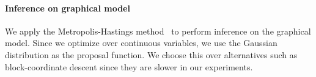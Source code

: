 

%



\vspace{-0.3cm}
\paragraph{Inference on graphical model}
We apply the Metropolis-Hastings method~\cite{mackay1998introduction} to perform inference on the graphical model. Since we optimize over continuous variables, we use the Gaussian distribution as the proposal function. We choose this over alternatives such as block-coordinate descent since they are slower in our experiments.



